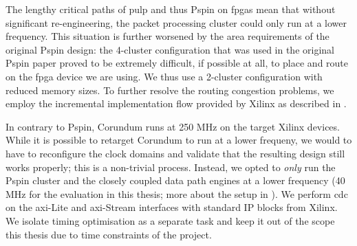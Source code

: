 The lengthy critical paths of \ac{pulp} and thus P\acs{spin} on \ac{fpga}s mean that without significant re-engineering, the packet processing cluster could only run at a lower frequency.  This situation is further worsened by the area requirements of the original P\acs{spin} design: the 4-cluster configuration that was used in the original P\acs{spin} paper proved to be extremely difficult, if possible at all, to place and route on the \ac{fpga} device we are using.  We thus use a 2-cluster configuration with reduced memory sizes.  To further resolve the routing congestion problems, we employ the incremental implementation flow provided by Xilinx as described in .

In contrary to P\acs{spin}, Corundum runs at 250 MHz on the target Xilinx devices.  While it is possible to retarget Corundum to run at a lower frequeny, we would to have to reconfigure the clock domains and validate that the resulting design still works properly; this is a non-trivial process.  Instead, we opted to \emph{only} run the P\acs{spin} cluster and the closely coupled data path engines at a lower frequency (40 MHz for the evaluation in this thesis; more about the setup in ).  We perform \ac{cdc} on the \ac{axi}-Lite and \ac{axi}-Stream interfaces with standard IP blocks from Xilinx.  We isolate timing optimisation as a separate task and keep it out of the scope this thesis due to time constraints of the project.
